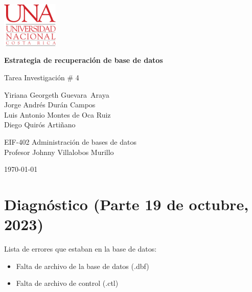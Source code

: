 \documentclass[11pt, article, natbib]{IEEEtran}
\begin{document}
\begin{titlepage}
	\includegraphics[width=0.2\textwidth]{../../../Files/logo-UNA blanco.png}
    \vspace{1cm}
   	\begin{changemargin}{4.5cm}{0cm}
       	\textbf{\Huge Estrategia de recuperación de base de datos}

       	\vspace{0.2cm}
       	\LARGE Tarea Investigación \# 4
            
       	\vspace{2cm}
		\Large
        Yiriana Georgeth Guevara Araya \\
        Jorge Andrés Durán Campos \\
        Luis Antonio Montes de Oca Ruiz \\
       	Diego Quirós Artiñano \\ 

       	\vspace{2cm}
       
		EIF-402 Administración de bases de datos \\
       	Profesor Johnny Villalobos Murillo \\
		       	
       	\vfill


       	\today
	\end{changemargin}
\end{titlepage}

\onecolumn
    \renewcommand{\contentsname}{\large Índice \\ \hrulefill}
\tableofcontents
\setcounter{tocdepth}{2}

\newpage

\twocolumn
\onehalfspace
\section{Diagnóstico (Parte 19 de octubre, 2023)}
Lista de errores que estaban en la base de datos:
\begin{itemize}
	\item Falta de archivo de la base de datos (.dbf)
	\item Falta de archivo de control (.ctl)
\end{itemize}
\end{document}
